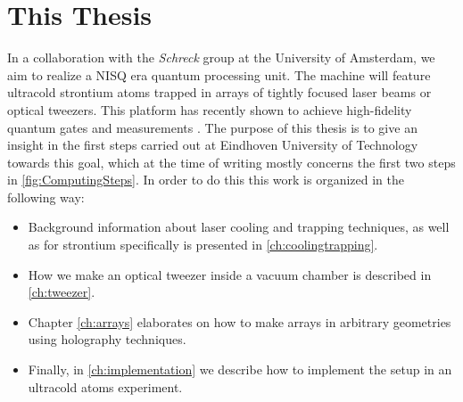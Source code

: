 \section{This Thesis}

In a collaboration with the \textit{Schreck} group at the University of Amsterdam, we aim to realize a \ac{NISQ} era quantum processing unit. The machine will feature ultracold strontium atoms trapped in arrays of tightly focused laser beams or optical tweezers. This platform has recently shown to achieve high-fidelity quantum gates and measurements \cite{Madjarov2020}. The purpose of this thesis is to give an insight in the first steps carried out at Eindhoven University of Technology towards this goal, which at the time of writing mostly concerns the first two steps in \cref{fig:ComputingSteps}. In order to do this this work is organized in the following way:

\begin{itemize}
	\setlength\itemsep{0em}
	\item Background information about laser cooling and trapping techniques, as well as for strontium specifically is presented in \cref{ch:coolingtrapping}. 

	\item How we make an optical tweezer inside a vacuum chamber is described in \cref{ch:tweezer}. 

	\item Chapter \ref{ch:arrays} elaborates on how to make arrays in arbitrary geometries using holography techniques.

	\item Finally, in \cref{ch:implementation} we describe how to implement the setup in an ultracold atoms experiment.
\end{itemize}










